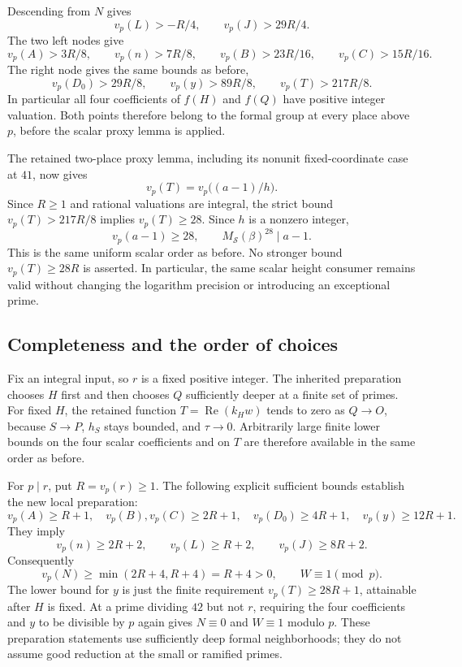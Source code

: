 Descending from $N$ gives
\[
 v_p(L)>-R/4,\qquad v_p(J)>29R/4.
\]
The two left nodes give
\[
 v_p(A)>3R/8,\qquad v_p(n)>7R/8,\qquad
 v_p(B)>23R/16,\qquad v_p(C)>15R/16.
\]
The right node gives the same bounds as before,
\[
 v_p(D_0)>29R/8,\qquad v_p(y)>89R/8,
 \qquad v_p(T)>217R/8.
\]
In particular all four coefficients of $f(H)$ and $f(Q)$ have positive
integer valuation. Both points therefore belong to the formal group at
every place above $p$, before the scalar proxy lemma is applied.

The retained two-place proxy lemma, including its nonunit fixed-coordinate
case at $41$, now gives
\[
 v_p(T)=v_p\bigl((a-1)/h\bigr).
\]
Since $R\ge1$ and rational valuations are integral, the strict bound
$v_p(T)>217R/8$ implies $v_p(T)\ge28$. Since $h$ is a nonzero integer,
\[
 v_p(a-1)\ge28,
 \qquad M_{\mathcal S}(\beta)^{28}\mid a-1.
\]
This is the same uniform scalar order as before. No stronger bound
$v_p(T)\ge28R$ is asserted. In particular, the same scalar height
consumer remains valid without changing the logarithm precision or
introducing an exceptional prime.

\subsection{Completeness and the order of choices}

Fix an integral input, so $r$ is a fixed positive integer. The inherited
preparation chooses $H$ first and then chooses $Q$ sufficiently deeper
at a finite set of primes. For fixed $H$, the retained function
$T=\operatorname{Re}(k_Hw)$ tends to zero as $Q\to O$, because
$S\to P$, $h_S$ stays bounded, and $\tau\to0$. Arbitrarily large
finite lower bounds on the four scalar coefficients and on $T$ are
therefore available in the same order as before.

For $p\mid r$, put $R=v_p(r)\ge1$. The following explicit sufficient
bounds establish the new local preparation:
\[
 v_p(A)\ge R+1,\quad v_p(B),v_p(C)\ge2R+1,
 \quad v_p(D_0)\ge4R+1,\quad v_p(y)\ge12R+1.
\]
They imply
\[
 v_p(n)\ge2R+2,\qquad v_p(L)\ge R+2,
 \qquad v_p(J)\ge8R+2.
\]
Consequently
\[
 v_p(N)\ge\min(2R+4,R+4)=R+4>0,
 \qquad W\equiv1\pmod p.
\]
The lower bound for $y$ is just the finite requirement
$v_p(T)\ge28R+1$, attainable after $H$ is fixed. At a prime dividing
$42$ but not $r$, requiring the four coefficients and $y$ to be
divisible by $p$ again gives $N\equiv0$ and $W\equiv1$ modulo $p$.
These preparation statements use sufficiently deep formal neighborhoods;
they do not assume good reduction at the small or ramified primes.

